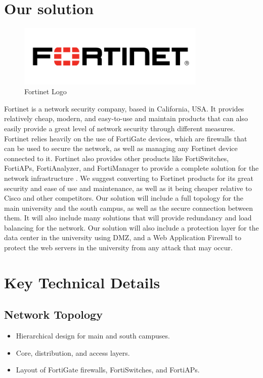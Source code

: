 \documentclass[12pt]{report}
\begin{document}
\section{Our solution}
\begin{figure}[h]
    \centering
    \includegraphics[width=0.8\textwidth]{images/fortinet.png}
    \caption{Fortinet Logo}
    \label{fig:fortinet logo}
\end{figure}
Fortinet is a network security company, based in California, USA. It provides relatively cheap, modern, and easy-to-use and maintain products that can also easily provide a great level of network security through different measures. Fortinet relies heavily on the use of FortiGate devices, which are firewalls that can be used to secure the network, as well as managing any Fortinet device connected to it. Fortinet also provides other products like FortiSwitches, FortiAPs, FortiAnalyzer, and FortiManager to provide a complete solution for the network infrastructure \cite{FortinetAbtus}. 
We suggest converting to Fortinet products for its great security and ease of use and maintenance, as well as it being cheaper relative to Cisco and other competitors. \cite{FNvsCISCO}
Our solution will include a full topology for the main university and the south campus, as well as the secure connection between them. It will also include many solutions that will provide redundancy and load balancing for the network.
Our solution will also include a protection layer for the data center in the university using DMZ, and a Web Application Firewall to protect the web servers in the university from any attack that may occur.

\section{Key Technical Details}
\subsection{Network Topology}
\begin{itemize}
    \item Hierarchical design for main and south campuses.
    \item Core, distribution, and access layers.
    \item Layout of FortiGate firewalls, FortiSwitches, and FortiAPs.
\end{itemize}
\end{document}
